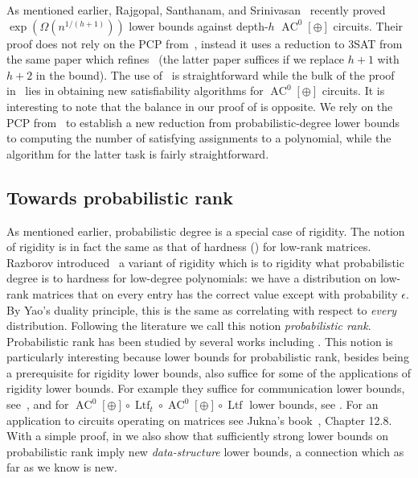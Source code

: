 \documentclass{toc}
\DeclareMathOperator{\Ltf}{\mathrm{Ltf}}  %
\DeclareMathOperator{\AC}{\mathrm{AC}}  %
\newcommand{\e}{\epsilon}
\begin{document}
As mentioned earlier, Rajgopal, Santhanam, and Srinivasan~\cite{DBLP:conf/mfcs/RajgopalS018}
recently proved $\exp(\Omega(n^{1/(h+1)}))$ lower bounds against
depth-$h$ $\AC^{0}[\oplus]$ circuits. Their proof does not rely on
the PCP from~\cite{Ben-SassonV-AC0PCP}, instead it uses a reduction
to 3SAT from the same paper which refines~\cite{JahanjouMV-explicit}
(the latter paper suffices if we replace $h+1$ with $h+2$ in the
bound). The use of~\cite{Ben-SassonV-AC0PCP} is straightforward while
the bulk of the proof in~\cite{DBLP:conf/mfcs/RajgopalS018} lies
in obtaining new satisfiability algorithms for $\AC^{0}[\oplus]$ circuits.
It is interesting to note that the balance in our proof 
of  is opposite. We rely on the PCP 
from~\cite{Ben-SassonV-AC0PCP}
to establish a new reduction from probabilistic-degree lower bounds
to computing the number of satisfying assignments to a polynomial,
while the algorithm for the latter task is fairly straightforward.

\subsection{Towards probabilistic rank}

As mentioned earlier, probabilistic degree is a special case of rigidity.
The notion of rigidity is in fact the same as that of hardness () for low-rank matrices. Razborov introduced~\cite{Razborov-rigidity}
a variant of rigidity which is to rigidity what probabilistic degree
is to hardness for low-degree polynomials: we have a distribution
on low-rank matrices that on every entry has the correct value except
with probability $\e$. By Yao's duality principle, this is the same
as correlating with respect to \emph{every }distribution. Following
the literature we call this notion \emph{probabilistic rank}. Probabilistic
rank has been studied by several works including \cite{DBLP:journals/cc/Wunderlich12,AlmanW17}.
This notion is particularly interesting because lower bounds for probabilistic
rank, besides being a prerequisite for rigidity lower bounds, also
suffice for some of the applications of rigidity lower bounds. For
example they suffice for communication lower bounds, see~\cite{DBLP:journals/cc/Wunderlich12},
and for $\AC^{0}[\oplus]\circ \Ltf_{t}\circ \AC^{0}[\oplus]\circ \Ltf$
lower bounds, see \cite{AlmanC19,AlmanW17}. For an application to
circuits operating on matrices see Jukna's book~\cite{Jukna2012},
Chapter 12.8. With a simple proof, in 
we also show that sufficiently strong lower bounds on probabilistic
rank imply new \emph{data-structure} lower\emph{ }bounds\emph{,} a
connection which as far as we know is new.
\end{document}
